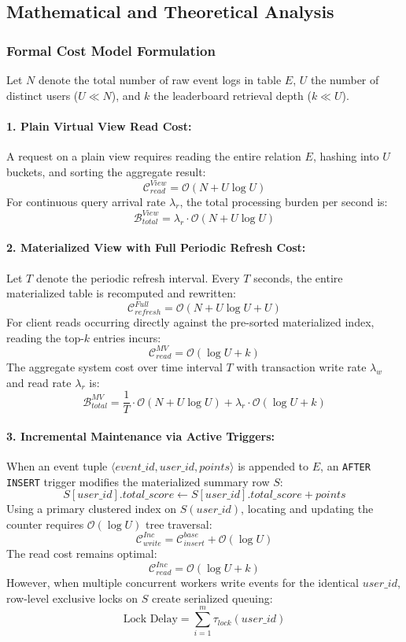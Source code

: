 \documentclass[11pt,a4paper]{report}
\begin{document}
\subsection{Mathematical and Theoretical Analysis}

\subsubsection{Formal Cost Model Formulation}
Let $N$ denote the total number of raw event logs in table $E$, $U$ the number of distinct users ($U \ll N$), and $k$ the leaderboard retrieval depth ($k \ll U$).

\paragraph{1. Plain Virtual View Read Cost:}
A request on a plain view requires reading the entire relation $E$, hashing into $U$ buckets, and sorting the aggregate result:
$$\mathcal{C}_{read}^{View} = \mathcal{O}\left(N + U \log U\right)$$
For continuous query arrival rate $\lambda_r$, the total processing burden per second is:
$$\mathcal{B}_{total}^{View} = \lambda_r \cdot \mathcal{O}(N + U \log U)$$

\paragraph{2. Materialized View with Full Periodic Refresh Cost:}
Let $T$ denote the periodic refresh interval. Every $T$ seconds, the entire materialized table is recomputed and rewritten:
$$\mathcal{C}_{refresh}^{Full} = \mathcal{O}\left(N + U \log U + U\right)$$
For client reads occurring directly against the pre-sorted materialized index, reading the top-$k$ entries incurs:
$$\mathcal{C}_{read}^{MV} = \mathcal{O}\left(\log U + k\right)$$
The aggregate system cost over time interval $T$ with transaction write rate $\lambda_w$ and read rate $\lambda_r$ is:
$$\mathcal{B}_{total}^{MV} = \frac{1}{T} \cdot \mathcal{O}(N + U \log U) + \lambda_r \cdot \mathcal{O}(\log U + k)$$

\paragraph{3. Incremental Maintenance via Active Triggers:}
When an event tuple $\langle event\_id, user\_id, points \rangle$ is appended to $E$, an \texttt{AFTER INSERT} trigger modifies the materialized summary row $S$:
$$S[user\_id].total\_score \leftarrow S[user\_id].total\_score + points$$
Using a primary clustered index on $S(user\_id)$, locating and updating the counter requires $\mathcal{O}(\log U)$ tree traversal:
$$\mathcal{C}_{write}^{Inc} = \mathcal{C}_{insert}^{base} + \mathcal{O}(\log U)$$
The read cost remains optimal:
$$\mathcal{C}_{read}^{Inc} = \mathcal{O}(\log U + k)$$
However, when multiple concurrent workers write events for the identical $user\_id$, row-level exclusive locks on $S$ create serialized queuing:
$$\text{Lock Delay} = \sum_{i=1}^{m} \tau_{lock}(user\_id)$$
\end{document}

